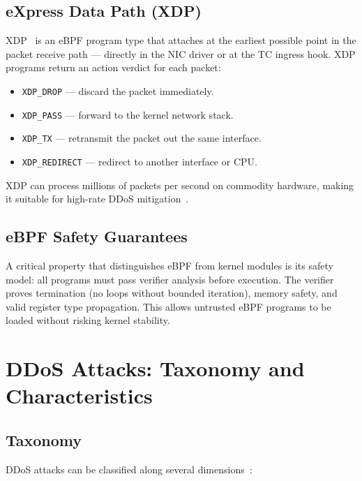 \subsection{eXpress Data Path (XDP)}
XDP~\cite{hoiland2018xdp} is an eBPF program type that attaches at the earliest possible
point in the packet receive path --- directly in the NIC driver or at the TC ingress hook.
XDP programs return an action verdict for each packet:
\begin{itemize}
  \item \texttt{XDP\_DROP} — discard the packet immediately.
  \item \texttt{XDP\_PASS} — forward to the kernel network stack.
  \item \texttt{XDP\_TX} — retransmit the packet out the same interface.
  \item \texttt{XDP\_REDIRECT} — redirect to another interface or CPU.
\end{itemize}
XDP can process millions of packets per second on commodity hardware, making it suitable
for high-rate DDoS mitigation~\cite{hoiland2018xdp}.

\subsection{eBPF Safety Guarantees}
A critical property that distinguishes eBPF from kernel modules is its safety model: all
programs must pass verifier analysis before execution. The verifier proves termination
(no loops without bounded iteration), memory safety, and valid register type propagation.
This allows untrusted eBPF programs to be loaded without risking kernel stability.

\section{DDoS Attacks: Taxonomy and Characteristics}
\label{sec:bg_ddos}

\subsection{Taxonomy}
DDoS attacks can be classified along several dimensions~\cite{ddos_survey_2022}:

